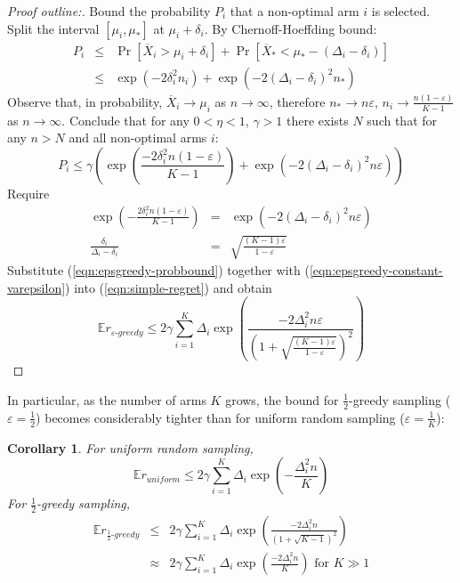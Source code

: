 \documentclass[letterpaper]{article}
\newcommand {\IE} {\ensuremath {\mathbb{E}}}
\newtheorem{crl}{Corollary}
\begin{document}
\begin{proof}[Proof outline:] 

Bound the probability $P_i$ that a non-optimal arm $i$ is selected. Split the interval
 $[\mu_i, \mu_*]$ at $\mu_i+\delta_i$. By Chernoff-Hoeffding bound:
\begin{eqnarray}
P_i&\le&\Pr[\overline X_i>\mu_i+\delta_i]+\Pr[\overline X_*<\mu_*-(\Delta_i-\delta_i)]\nonumber\\
   &\le&\exp\left(-2\delta_i^2n_i\right)+\exp\left(-2(\Delta_i-\delta_i)^2n_*\right)
\end{eqnarray}
Observe that, in probability, $\overline X_i \rightarrow \mu_i$ as $n\rightarrow\infty$, 
therefore $n_*\rightarrow n\varepsilon$, $n_i\rightarrow\frac
{n(1-\varepsilon)} {K-1}$ as $n\rightarrow \infty$. Conclude that for
any $0<\eta<1$, $\gamma>1$ there exists $N$ such that for any $n>N$ and
all non-optimal arms $i$:
\begin{equation}
P_i \le \gamma \left(\exp\left(\frac {-2\delta_i^2n(1-\varepsilon)}{K-1}\right)
+\exp\left(-2(\Delta_i-\delta_i)^2n\varepsilon\right)\right)
\label{eqn:epsgreedy-probbound}
\end{equation}
Require
\begin{eqnarray}
\exp\left(-\frac {2\delta_i^2n(1-\varepsilon)}{K-1}\right)
&=&\exp\left(-2(\Delta_i-\delta_i)^2n\varepsilon\right)\nonumber\\
\frac {\delta_i} {\Delta_i-\delta_i}&=&\sqrt{\frac {(K-1)\varepsilon} {1-\varepsilon}}
\label{eqn:epsgreedy-constant-varepsilon}
\end{eqnarray}
Substitute (\ref{eqn:epsgreedy-probbound}) together with
(\ref{eqn:epsgreedy-constant-varepsilon}) into
(\ref{eqn:simple-regret}) and obtain
\begin{equation}
\IE r_{\varepsilon\mbox{-}greedy}\le 2\gamma \sum_{i=1}^K\Delta_i\exp\left(\frac {-2\Delta_i^2n\varepsilon}
  {\left(1+\sqrt{\frac {(K-1)\varepsilon}
        {1-\varepsilon}}\right)^2}\right)
\end{equation}
\end{proof}

In particular, as the number of arms $K$ grows, the bound for $\frac 1
2$-greedy sampling ($\varepsilon=\frac 1 2$) becomes considerably tighter than for uniform
random sampling ($\varepsilon=\frac 1 K$):
\begin{crl}
For uniform random sampling, 
\begin{equation}
\IE r_{uniform}\le 2\gamma \sum_{i=1}^K\Delta_i\exp\left(-\frac {\Delta_i^2n} {K}\right)
\end{equation}
For $\frac 1 2$-greedy sampling,
\begin{eqnarray}
\IE r_{\frac 1 2\mbox{-}greedy}&\le& 2\gamma \sum_{i=1}^K\Delta_i\exp\left(\frac {-2\Delta_i^2n}
  {\left(1+\sqrt{K-1}\right)^2}\right)\\
  &\approx& 2\gamma \sum_{i=1}^K\Delta_i\exp\left(\frac
    {-2\Delta_i^2n} {K}\right)\mbox{ for }K\gg 1\nonumber
\end{eqnarray}
\end{crl}
\end{document}
